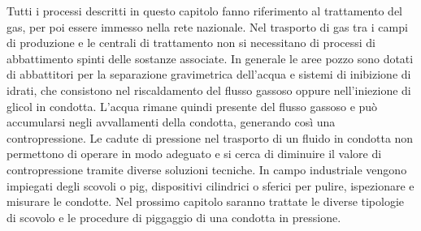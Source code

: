 Tutti i processi descritti in questo capitolo fanno riferimento al trattamento del gas, per poi essere immesso nella rete nazionale. Nel trasporto di gas tra i campi di produzione e le centrali di trattamento non si necessitano di processi di abbattimento spinti delle sostanze associate. In generale le aree pozzo sono dotati di abbattitori per la separazione gravimetrica dell'acqua e sistemi di inibizione di idrati, che consistono nel riscaldamento del flusso gassoso oppure nell'iniezione di glicol in condotta. L'acqua rimane quindi presente del flusso gassoso e può accumularsi negli avvallamenti della condotta, generando così una contropressione. Le cadute di pressione nel trasporto di un fluido in condotta non permettono di operare in modo adeguato e si cerca di diminuire il valore di contropressione tramite diverse soluzioni tecniche. In campo industriale vengono impiegati degli scovoli o pig, dispositivi cilindrici o sferici per pulire, ispezionare e misurare le condotte. Nel prossimo capitolo saranno trattate le diverse tipologie di scovolo e le procedure di piggaggio di una condotta in pressione.
